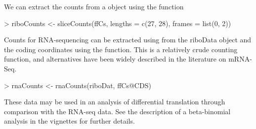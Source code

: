 \documentclass[a4paper]{article}
\begin{document}
We can extract the counts from a  object using the  function

\begin{Schunk}
\begin{Sinput}
> riboCounts <- sliceCounts(ffCs, lengths = c(27, 28), frames = list(0, 2))
\end{Sinput}
\end{Schunk}

Counts for RNA-sequencing can be extracted using from the riboData object and the coding coordinates using the  function. This is a relatively crude counting function, and alternatives have been widely described in the literature on mRNA-Seq.

\begin{Schunk}
\begin{Sinput}
> rnaCounts <- rnaCounts(riboDat, ffCs@CDS)
\end{Sinput}
\end{Schunk}

These data may be used in an analysis of differential translation through comparison with the RNA-seq data. See the description of a beta-binomial analysis in the  vignettes for further details.
\end{document}

